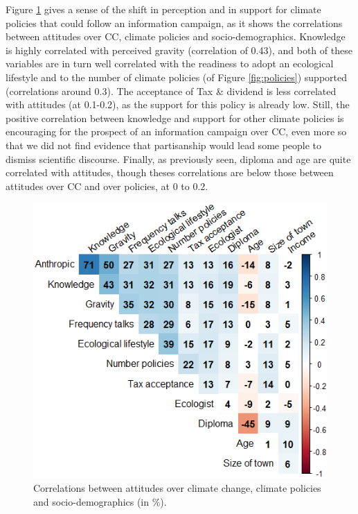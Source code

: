 \documentclass[english,5p,authoryear]{elsarticle}
\begin{document}

Figure \ref{fig:correlations} gives a sense of the shift in perception and in support for climate policies that could follow an information campaign, as it shows the correlations between attitudes over CC, climate policies and socio-demographics. Knowledge is highly correlated with perceived gravity (correlation of 0.43), and both of these variables are in turn well correlated with the readiness to adopt an ecological lifestyle and to the number of climate policies (of Figure \ref{fig:policies}) supported (correlations around 0.3). The acceptance of Tax \& dividend is less correlated with attitudes (at 0.1-0.2), as the support for this policy is already low. Still, the positive correlation between knowledge and support for other climate policies is encouraging for the prospect of an information campaign over CC, even more so that we did not find evidence that partisanship would lead some people to dismiss scientific discourse. Finally, as previously seen, diploma and age are quite correlated with attitudes, though theses correlations are below those between attitudes over CC and over policies, at 0 to 0.2. 

\begin{figure}[!htbp]
\centering
\includegraphics[width=1\columnwidth]{Images/correlations.png}
\caption{Correlations between attitudes over climate change, climate policies and socio-demographics (in \%).}
\label{fig:correlations}
\end{figure}
\end{document}
